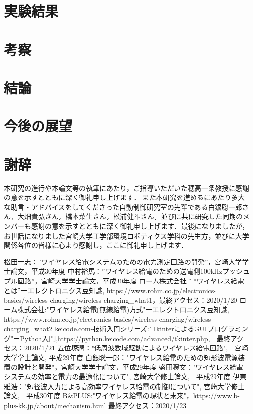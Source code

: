 \documentclass[12pt]{jarticle}
\begin{document}
\section{実験結果}

\section{考察}

\section{結論}

\section{今後の展望}

\clearpage
\section{謝辞}
 本研究の進行や本論文等の執筆にあたり，ご指導いただいた穂高一条教授に感謝の意を示すとともに深く御礼申し上げます．
また本研究を進めるにあたり多大な助言・アドバイスをしてくださった自動制御研究室の先輩である白銀聡一郎さん，大畑貴弘さん，橋本菜生さん，松浦健斗さん，並びに共に研究した同期のメンバーも感謝の意を示すとともに深く御礼申し上げます．最後になりましたが，お世話になりました宮崎大学工学部環境ロボティクス学科の先生方，並びに大学関係各位の皆様に心より感謝し，ここに御礼申し上げます．

\begin{thebibliography}{50}
	松田一志：”ワイヤレス給電システムのための電力測定回路の開発”，宮崎大学学士論文，平成30年度
	中村裕馬：”ワイヤレス給電のための送電側100kHzプッシュプル回路”，宮崎大学学士論文，平成30年度
	ローム株式会社：”ワイヤレス給電とは”ーエレクトロニクス豆知識, https://www.rohm.co.jp/electronics-basics/wireless-charging/wireless-charging\_what1，最終アクセス：2020/1/20
	ローム株式会社:"ワイヤレス給電(無線給電)方式"ーエレクトロニクス豆知識, https://www.rohm.co.jp/electronics-basics/wireless-charging/wireless-charging\_what2
	keicode.com-技術入門シリーズ:"TkinterによるGUIプログラミング"ーPython入門,https://python.keicode.com/advanced/tkinter.php,　最終アクセス：2020/1/21
	五位塚潤："低周波数域駆動によるワイヤレス給電回路",　宮崎大学学士論文, 平成29年度
	白銀聡一郎："ワイヤレス給電のための短形波電源装置の設計と開発"，宮崎大学学士論文，平成29年度
	盛田穣文："ワイヤレス給電システムの効率と電力の最適化について", 宮崎大学修士論文,　平成29年度
	伊東雅浩："短径波入力による高効率ワイヤレス給電の制御について", 宮崎大学修士論文,　平成30年度
	B\&PLUS:"ワイヤレス給電の現状と未来"，https://www.b-plus-kk.jp/about/mechanism.html 最終アクセス：2020/1/23
\end{thebibliography}
\clearpage
\end{document}
